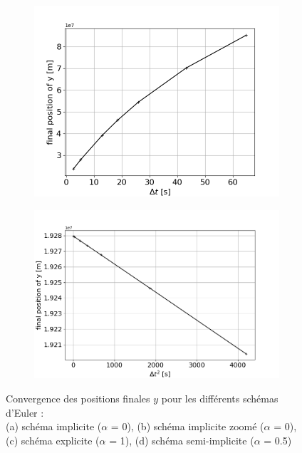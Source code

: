 \documentclass[a4paper,12pt,twoside]{article}
\begin{document}
\begin{figure}[H]
\begin{subfigure}{0.45\textwidth}
\end{subfigure}
\begin{subfigure}{0.45\textwidth}  %
    \centering  %
    \includegraphics[scale=0.42]{Graphes/convergence_y_alpha_1.png}
    \captionsetup{justification = centering, font=large}
    \caption{}
\end{subfigure}
\hspace{0.05\textwidth}
\begin{subfigure}{0.45\textwidth}  %
    \centering  %
    \includegraphics[scale=0.37]{Graphes/convergence_y_alpha_05.png}
    \captionsetup{justification = centering, font=large}
    \caption{}
\end{subfigure}
\captionsetup{justification=centering}
\caption{Convergence des positions finales $y$ pour les différents schémas d'Euler : \\ (a) schéma implicite ($\alpha$ = 0), (b) schéma implicite zoomé ($\alpha$ = 0), \\ (c) schéma explicite ($\alpha$ = 1), (d) schéma semi-implicite ($\alpha$ = 0.5)}
\label{fig6}
\end{figure}
\end{document}
